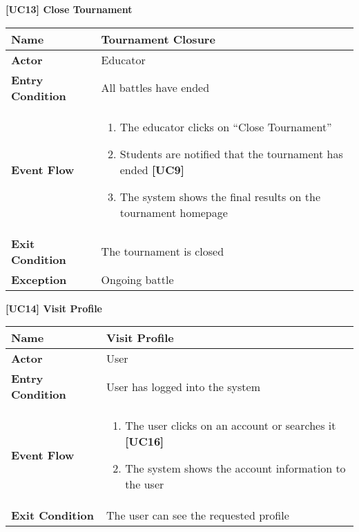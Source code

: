 \documentclass{article}
\begin{document}
\begin{table}
 \renewcommand{\arraystretch}{1.5}
    \centering
    \raggedright\textbf{[UC13] Close Tournament}
    \begin{tabular}{|l|p{10cm}|}
        \hline
        \textbf{Name} & Tournament Closure \\
        \hline
        \textbf{Actor} & Educator \\
        \hline
        \textbf{Entry Condition} & All battles have ended\\
        \hline
        \textbf{Event Flow} & 
        \begin{enumerate}[align=left, topsep=0pt, partopsep=0pt]
            \item The educator clicks on “Close Tournament”
            \item Students are notified that the tournament has ended \textbf{[UC9]}
            \item The system shows the final results on the tournament homepage 
        \end{enumerate} \\
        \hline
        \textbf{Exit Condition} & The tournament is closed \\
        \hline
        \textbf{Exception} & Ongoing battle \\
        \hline
    \end{tabular}
\end{table}

\begin{table}
 \renewcommand{\arraystretch}{1.5}
    \centering
    \raggedright\textbf{[UC14] Visit Profile}
    \begin{tabular}{|l|p{10cm}|}
        \hline
        \textbf{Name} & Visit Profile \\
        \hline
        \textbf{Actor} & User \\
        \hline
        \textbf{Entry Condition} & User has logged into the system\\
        \hline
        \textbf{Event Flow} & 
        \begin{enumerate}[align=left, topsep=0pt, partopsep=0pt]
            \item The user clicks on an account or searches it \textbf{[UC16]}
            \item The system shows the account information to the user
        \end{enumerate} \\
        \hline
        \textbf{Exit Condition} & The user can see the requested profile \\
        \hline
    \end{tabular}
\end{table}
\end{document}
